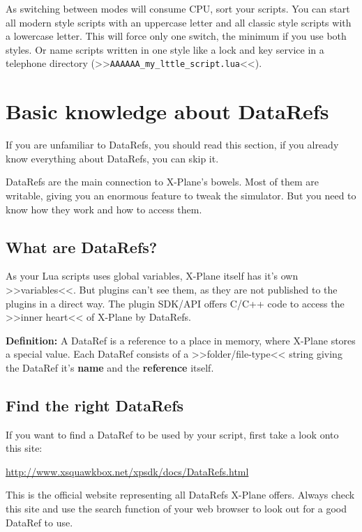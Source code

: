 \documentclass[11pt,parskip=half,a4paper]{scrartcl}
\begin{document}
As switching between modes will consume CPU, sort your scripts. You can start all modern style scripts with an uppercase letter and all classic style scripts with a lowercase letter. This will force only one switch, the minimum if you use both styles. Or name scripts written in one style like a lock and key service in a telephone directory (>>\verb|AAAAAA_my_lttle_script.lua|<<).

\section{Basic knowledge about DataRefs}

If you are unfamiliar to DataRefs, you should read this section, if you already know everything about DataRefs, you can skip it.

DataRefs are the main connection to X-Plane's bowels. Most of them are writable, giving you an enormous feature to tweak the simulator. But you need to know how they work and how to access them.

\subsection{What are DataRefs?}

As your Lua scripts uses global variables, X-Plane itself has it's own >>variables<<. But plugins can't see them, as they are not published to the plugins in a direct way. The plugin SDK/API offers C/C++ code to access the >>inner heart<< of X-Plane by DataRefs.

\vspace{2ex}

\textbf{Definition:} A DataRef is a reference to a place in memory, where X-Plane stores a special value. Each DataRef consists of a >>folder/file-type<< string giving the DataRef it's \textbf{name} and the \textbf{reference} itself.

\vspace{2ex}

\subsection{Find the right DataRefs}

If you want to find a DataRef to be used by your script, first take a look onto this site:

\url{http://www.xsquawkbox.net/xpsdk/docs/DataRefs.html}

This is the official website representing all DataRefs X-Plane offers. Always check this site and use the search function of your web browser to look out for a good DataRef to use.
\end{document}
